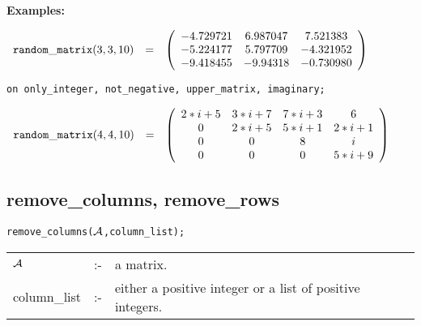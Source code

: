 {\bf Examples:}

\begin{flushleft}  
\hspace*{0.1in}
\begin{math}  
\begin{array}{ccc}
{\tt random\_matrix}(3,3,10) & = & 
        \left( \begin{array}{ccc} -4.729721 & 6.987047 & 7.521383 \\
- 5.224177 & 5.797709 & - 4.321952 \\
- 9.418455 & - 9.94318 & - 0.730980
 \end{array} \right) 
\end{array}
\end{math}  
\end{flushleft}

\vspace*{0.2in}
\hspace*{0.165in}
{\tt on only\_integer, not\_negative, upper\_matrix, imaginary;}
\begin{flushleft}  
\hspace*{0.12in}
\begin{math}        
\begin{array}{ccc}
{\tt random\_matrix}(4,4,10) & = & 
\left( \begin{array}{cccc} 2*i+5 & 3*i+7 & 7*i+3 & 6 \\ 0 & 2*i+5 & 
5*i+1 & 2*i+1 \\ 0 & 0 & 8 & i \\ 0 & 0 & 0& 5*i+9 
\end{array} \right)
\end{array}
\end{math}  
\end{flushleft}


\subsection{remove\_columns, remove\_rows}


\hspace*{0.175in} {\tt remove\_columns(${\cal A}$,column\_list);}

\hspace*{0.1in}  
\begin{tabular}{l l l} 
${\cal A}$   &:-& a matrix. \\
column\_list &:-& either a positive integer or a list of 
                  positive integers.
\end{tabular}

